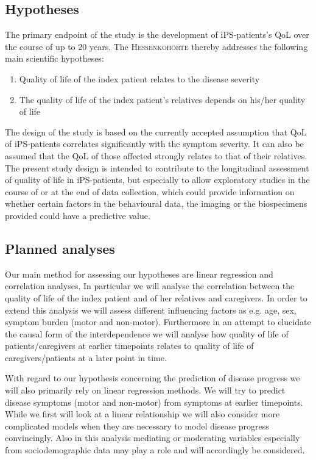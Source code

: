 \subsection{Hypotheses}
\label{sec:hypotheses}
The primary endpoint of the study is the development of \ac{iPS}-patients's \ac{QoL} over the course of up to 20 years. The \textsc{Hessenkohorte} thereby addresses the following main scientific hypotheses:
\begin{enumerate}
  \item Quality of life of the index patient relates to the disease severity
  \item The quality of life of the index patient's relatives depends on his/her quality of life
\end{enumerate}
The design of the study is based on the currently accepted assumption that \ac{QoL} of \ac{iPS}-patients correlates significantly with the symptom severity. It can also be assumed that the \ac{QoL} of those affected strongly relates to that of their relatives. The present study design is intended to contribute to the longitudinal assessment of quality of life in \ac{iPS}-patients, but especially to allow exploratory studies in the course of or at the end of data collection, which could provide information on whether certain factors in the behavioural data, the imaging or the biospecimens provided could have a predictive value.

\subsection{Planned analyses}
Our main method for assessing our hypotheses are linear regression and correlation analyses. In particular we will analyse the correlation between the quality of life of the index patient and of her relatives and caregivers. In order to extend this analysis we will assess different influencing factors as e.g. age, sex, symptom burden (motor and non-motor). Furthermore in an attempt to elucidate the causal form of the interdependence we will analyse how quality of life of patients/caregivers at earlier timepoints relates to quality of life of caregivers/patients at a later point in time.

With regard to our hypothesis concerning the prediction of disease progress we will also primarily rely on linear regression methods. We will try to predict disease symptoms (motor and non-motor) from symptoms at earlier timepoints. While we first will look at a linear relationship we will also consider more complicated models when they are necessary to model disease progress convincingly. Also in this analysis mediating or moderating variables especially from sociodemographic data may play a role and will accordingly be considered.

